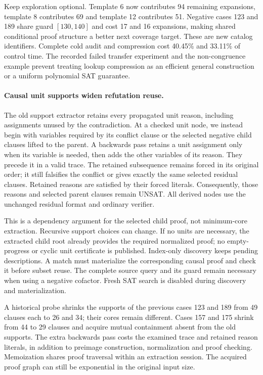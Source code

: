 \documentclass[11pt,a4paper]{article}
\numberwithin{equation}{section}
\theoremstyle{plain}
\theoremstyle{definition}
\theoremstyle{remark}
\begin{document}
Keep exploration optional. Template 6 now contributes 94 remaining expansions,
template 8 contributes 69 and template 12 contributes 51. Negative cases 123
and 189 share guard $[130,140]$ and cost 17 and 16 expansions, making shared
conditional proof structure a better next coverage target. These are new
catalog identifiers. Complete cold audit and compression cost 40.45\% and
33.11\% of control time. The recorded failed transfer experiment and the
non-congruence example prevent treating lookup compression as an efficient
general construction or a uniform polynomial SAT guarantee.

\paragraph{Causal unit supports widen refutation reuse.}
The old support extractor retains every propagated unit reason, including
assignments unused by the contradiction. At a checked unit node, we instead
begin with variables required by its conflict clause or the selected negative
child clauses lifted to the parent. A backwards pass retains a unit assignment
only when its variable is needed, then adds the other variables of its reason.
They precede it in a valid trace. The retained subsequence remains forced in its
original order; it still falsifies the conflict or gives exactly the same
selected residual clauses. Retained reasons are satisfied by their forced
literals. Consequently, those reasons and selected parent clauses remain UNSAT.
All derived nodes use the unchanged residual format and ordinary verifier.

This is a dependency argument for the selected child proof, not minimum-core
extraction. Recursive support choices can change. If no units are necessary,
the extracted child root already provides the required normalized proof;
no empty-progress or cyclic unit certificate is published. Index-only discovery
keeps pending descriptions. A match must materialize the corresponding causal
proof and check it before subset reuse. The complete source query and its guard
remain necessary when using a negative cofactor. Fresh SAT search is disabled
during discovery and materialization.

A historical probe shrinks the supports of the previous cases 123 and 189 from
49 clauses each to 26 and 34; their cores remain different. Cases 157 and 175
shrink from 44 to 29 clauses and acquire mutual containment absent from the old
supports. The extra backwards pass costs the examined trace and retained reason
literals, in addition to preimage construction, normalization and proof checking.
Memoization shares proof traversal within an extraction session. The acquired
proof graph can still be exponential in the original input size.
\end{document}
